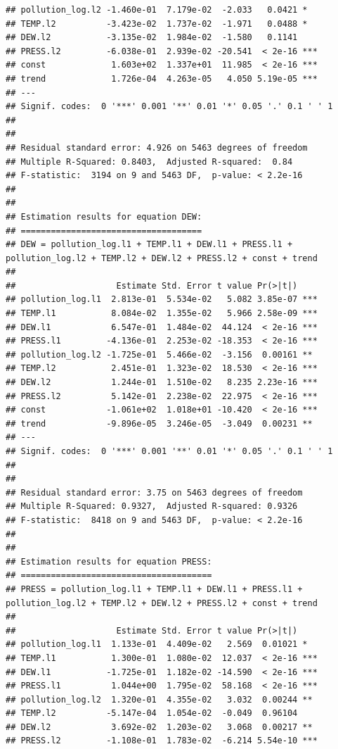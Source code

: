 \documentclass[
]{article}
\begin{document}
\begin{verbatim}
## pollution_log.l2 -1.460e-01  7.179e-02  -2.033   0.0421 *  
## TEMP.l2          -3.423e-02  1.737e-02  -1.971   0.0488 *  
## DEW.l2           -3.135e-02  1.984e-02  -1.580   0.1141    
## PRESS.l2         -6.038e-01  2.939e-02 -20.541  < 2e-16 ***
## const             1.603e+02  1.337e+01  11.985  < 2e-16 ***
## trend             1.726e-04  4.263e-05   4.050 5.19e-05 ***
## ---
## Signif. codes:  0 '***' 0.001 '**' 0.01 '*' 0.05 '.' 0.1 ' ' 1
## 
## 
## Residual standard error: 4.926 on 5463 degrees of freedom
## Multiple R-Squared: 0.8403,  Adjusted R-squared:  0.84 
## F-statistic:  3194 on 9 and 5463 DF,  p-value: < 2.2e-16 
## 
## 
## Estimation results for equation DEW: 
## ==================================== 
## DEW = pollution_log.l1 + TEMP.l1 + DEW.l1 + PRESS.l1 + pollution_log.l2 + TEMP.l2 + DEW.l2 + PRESS.l2 + const + trend 
## 
##                    Estimate Std. Error t value Pr(>|t|)    
## pollution_log.l1  2.813e-01  5.534e-02   5.082 3.85e-07 ***
## TEMP.l1           8.084e-02  1.355e-02   5.966 2.58e-09 ***
## DEW.l1            6.547e-01  1.484e-02  44.124  < 2e-16 ***
## PRESS.l1         -4.136e-01  2.253e-02 -18.353  < 2e-16 ***
## pollution_log.l2 -1.725e-01  5.466e-02  -3.156  0.00161 ** 
## TEMP.l2           2.451e-01  1.323e-02  18.530  < 2e-16 ***
## DEW.l2            1.244e-01  1.510e-02   8.235 2.23e-16 ***
## PRESS.l2          5.142e-01  2.238e-02  22.975  < 2e-16 ***
## const            -1.061e+02  1.018e+01 -10.420  < 2e-16 ***
## trend            -9.896e-05  3.246e-05  -3.049  0.00231 ** 
## ---
## Signif. codes:  0 '***' 0.001 '**' 0.01 '*' 0.05 '.' 0.1 ' ' 1
## 
## 
## Residual standard error: 3.75 on 5463 degrees of freedom
## Multiple R-Squared: 0.9327,  Adjusted R-squared: 0.9326 
## F-statistic:  8418 on 9 and 5463 DF,  p-value: < 2.2e-16 
## 
## 
## Estimation results for equation PRESS: 
## ====================================== 
## PRESS = pollution_log.l1 + TEMP.l1 + DEW.l1 + PRESS.l1 + pollution_log.l2 + TEMP.l2 + DEW.l2 + PRESS.l2 + const + trend 
## 
##                    Estimate Std. Error t value Pr(>|t|)    
## pollution_log.l1  1.133e-01  4.409e-02   2.569  0.01021 *  
## TEMP.l1           1.300e-01  1.080e-02  12.037  < 2e-16 ***
## DEW.l1           -1.725e-01  1.182e-02 -14.590  < 2e-16 ***
## PRESS.l1          1.044e+00  1.795e-02  58.168  < 2e-16 ***
## pollution_log.l2  1.320e-01  4.355e-02   3.032  0.00244 ** 
## TEMP.l2          -5.147e-04  1.054e-02  -0.049  0.96104    
## DEW.l2            3.692e-02  1.203e-02   3.068  0.00217 ** 
## PRESS.l2         -1.108e-01  1.783e-02  -6.214 5.54e-10 ***

\end{verbatim}
\end{document}
